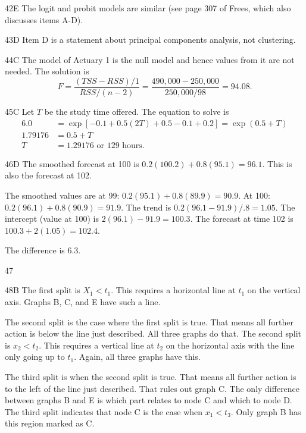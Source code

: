 \begin{solution}{42}{E}
The logit and probit models are similar (see page 307 of Frees, which also discusses items A-D).
\end{solution}

\begin{solution}{43}{D}
Item D is a statement about principal components analysis, not clustering.
\end{solution}

\begin{solution}{44}{C}
The model of Actuary 1 is the null model and hence values from it are not needed. The solution is
\[ F = \frac{(TSS - RSS)/1}{RSS/(n-2)} = \frac{490{,}000 - 250{,}000}{250{,}000/98} = 94.08. \]
\end{solution}

\begin{solution}{45}{C}
Let $T$ be the study time offered. The equation to solve is
\begin{align*}
6.0 &= \exp[-0.1 + 0.5(2T) + 0.5 - 0.1 + 0.2] = \exp(0.5 + T) \\
1.79176 &= 0.5 + T \\
T &= 1.29176 \text{ or } 129 \text{ hours.}
\end{align*}
\end{solution}

\begin{solution}{46}{D}
The smoothed forecast at 100 is $0.2(100.2) + 0.8(95.1) = 96.1$. This is also the forecast at 102.

The smoothed values are at 99: $0.2(95.1) + 0.8(89.9) = 90.9$. At 100: $0.2(96.1) + 0.8(90.9) = 91.9$. The trend is $0.2(96.1 - 91.9)/.8 = 1.05$. The intercept (value at 100) is $2(96.1) - 91.9 = 100.3$. The forecast at time 102 is $100.3 + 2(1.05) = 102.4$.

The difference is 6.3.
\end{solution}

\begin{solution}{47}{}
\deleted
\end{solution}

\begin{solution}{48}{B}
The first split is $X_1 < t_1$. This requires a horizontal line at $t_1$ on the vertical axis. Graphs B, C, and E have such a line.

The second split is the case where the first split is true. That means all further action is below the line just described. All three graphs do that. The second split is $x_2 < t_2$. This requires a vertical line at $t_2$ on the horizontal axis with the line only going up to $t_1$. Again, all three graphs have this.

The third split is when the second split is true. That means all further action is to the left of the line just described. That rules out graph C. The only difference between graphs B and E is which part relates to node C and which to node D. The third split indicates that node C is the case when $x_1 < t_3$. Only graph B has this region marked as C.
\end{solution}

